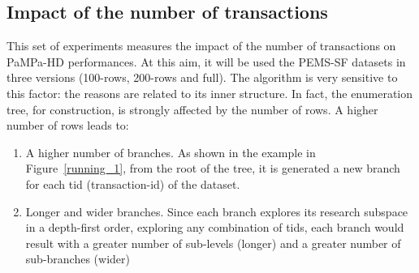 
\subsection{Impact of the number of transactions}\label{number_rows}
This set of experiments measures the impact of the number of transactions on PaMPa-HD performances. At this aim, it will be used the PEMS-SF datasets in three versions (100-rows, 200-rows and full).
The algorithm is very sensitive to this factor: the reasons are related to its inner structure. In fact, the enumeration tree, for construction, is strongly affected by the number of rows. A higher number of rows leads to:
\begin{enumerate}
\item A higher number of branches. As shown in the example in Figure~\ref{running_1}, from the root of the tree, it is generated a new branch for each tid (transaction-id) of the dataset.
\item Longer and wider branches. Since each branch explores its research subspace in a depth-first order, exploring any combination of tids, each branch would result with a greater number of sub-levels (longer) and a greater number of sub-branches (wider)
\end{enumerate}

